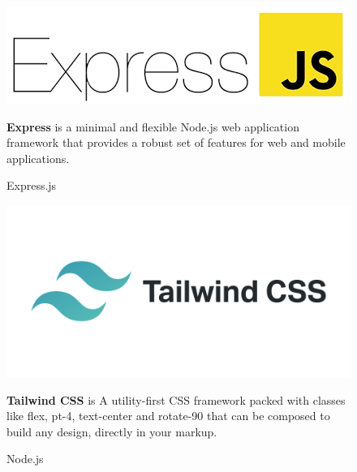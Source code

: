 \begin{figure}[h]
\centering
\begin{minipage}{0.3\textwidth}
    \centering
    \includegraphics[width=\linewidth,frame]{figures/express.png}
    \caption{Express.js}
\end{minipage}
\hfill
\begin{minipage}{0.6\textwidth}
  \textbf{Express} is a minimal and flexible Node.js web application framework that provides a robust set of features for web and mobile applications.\cite{samplewebs17}
\end{minipage}
\end{figure}

\begin{figure}[h]
\centering
\begin{minipage}{0.3\textwidth}
    \centering
    \includegraphics[width=\linewidth,frame]{figures/tailwind.png}
    \caption{Node.js}
\end{minipage}
\hfill
\begin{minipage}{0.6\textwidth}
  \textbf{Tailwind CSS} is A utility-first CSS framework packed with classes like flex, pt-4, text-center and rotate-90 that can be composed to build any design, directly in your markup.\cite{samplewebs19}
\end{minipage}
\end{figure}

